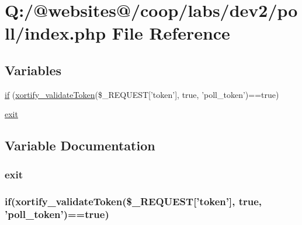 \hypertarget{index_8php}{\section{Q\-:/@websites@/coop/labs/dev2/poll/index.php File Reference}
\label{index_8php}
}
\subsection*{Variables}
\begin{DoxyCompactItemize}
\item 
\hyperlink{index_8php_ae2ccdf355624402b65fc2226f2a661cd}{if} (\hyperlink{functions_8php_ad760c4a5c7120b190ffb3551eff03db2}{xortify\-\_\-validate\-Token}(\$\-\_\-\-R\-E\-Q\-U\-E\-S\-T\mbox{[}'token'\mbox{]}, true, 'poll\-\_\-token')==true)
\item 
\hyperlink{index_8php_a6733eb5f605d09eaede9845835d71c4e}{exit}
\end{DoxyCompactItemize}


\subsection{Variable Documentation}
\hypertarget{index_8php_a6733eb5f605d09eaede9845835d71c4e}{
\subsubsection[{exit}]{\setlength{\rightskip}{0pt plus 5cm}exit}}\label{index_8php_a6733eb5f605d09eaede9845835d71c4e}
\hypertarget{index_8php_ae2ccdf355624402b65fc2226f2a661cd}{
\subsubsection[{if}]{\setlength{\rightskip}{0pt plus 5cm}if({\bf xortify\-\_\-validate\-Token}(\$\-\_\-\-R\-E\-Q\-U\-E\-S\-T\mbox{[}'token'\mbox{]}, true, 'poll\-\_\-token')==true)}}\label{index_8php_ae2ccdf355624402b65fc2226f2a661cd}
